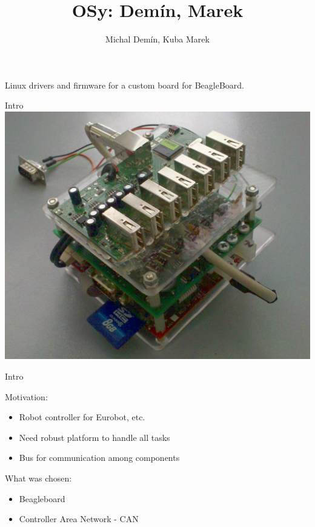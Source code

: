 \documentclass{beamer}
\title{OSy: Demín, Marek}
\author{Michal Demín, Kuba Marek}
\date{}
\begin{document}
\begin{frame}[plain]
\titlepage
Linux drivers and firmware for a custom board for BeagleBoard.
\end{frame}

\begin{frame}{Intro}
\includegraphics[height=\textheight]{../img/main}
\end{frame}

\begin{frame}{Intro}

Motivation:
\begin{itemize}
\item Robot controller for Eurobot, etc.
\item Need robust platform to handle all tasks
\item Bus for communication among components
\end{itemize}

What was chosen:
\begin{itemize}
\item Beagleboard
\item Controller Area Network - CAN
\end{itemize}
\end{frame}
\end{document}
